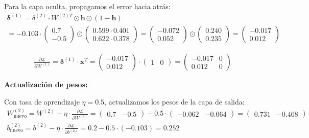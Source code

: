 Para la capa oculta, propagamos el error hacia atrás:
\begin{gather*}
	\boldsymbol{\delta}^{(1)} = \delta^{(2)} \cdot W^{(2)T} \odot \mathbf{h} \odot (1 - \mathbf{h}) \\
	= -0.103 \cdot \begin{pmatrix} 0.7 \\ -0.5 \end{pmatrix} \odot \begin{pmatrix} 0.599 \cdot 0.401 \\ 0.622 \cdot 0.378 \end{pmatrix}
	= \begin{pmatrix} -0.072 \\ 0.052 \end{pmatrix} \odot \begin{pmatrix} 0.240 \\ 0.235 \end{pmatrix}
	= \begin{pmatrix} -0.017 \\ 0.012 \end{pmatrix}
\end{gather*}

\begin{gather*}
	\frac{\partial \mathcal{L}}{\partial W^{(1)}} = \boldsymbol{\delta}^{(1)} \cdot \mathbf{x}^T = \begin{pmatrix} -0.017 \\ 0.012 \end{pmatrix} \cdot \begin{pmatrix} 1 & 0 \end{pmatrix} = \begin{pmatrix} -0.017 & 0 \\ 0.012 & 0 \end{pmatrix}
\end{gather*}

\textbf{Actualización de pesos:}

Con tasa de aprendizaje \(\eta = 0.5\), actualizamos los pesos de la capa de salida:
\begin{gather*}
	W^{(2)}_{\text{nuevo}} = W^{(2)} - \eta \cdot \frac{\partial \mathcal{L}}{\partial W^{(2)}} = \begin{pmatrix} 0.7 & -0.5 \end{pmatrix} - 0.5 \cdot \begin{pmatrix} -0.062 & -0.064 \end{pmatrix} = \begin{pmatrix} 0.731 & -0.468 \end{pmatrix} \\[0.3em]
	b^{(2)}_{\text{nuevo}} = b^{(2)} - \eta \cdot \frac{\partial \mathcal{L}}{\partial b^{(2)}} = 0.2 - 0.5 \cdot (-0.103) = 0.252
\end{gather*}

